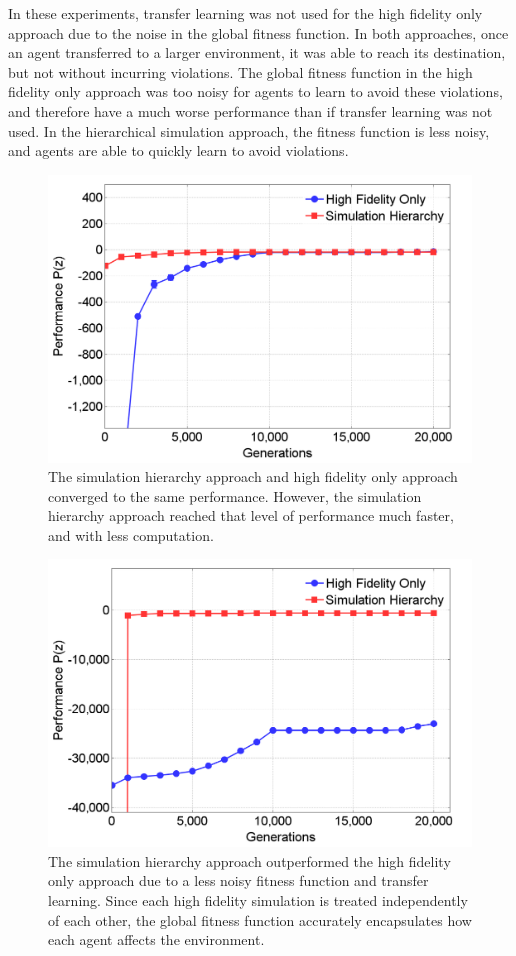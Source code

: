 \documentclass{aamas2014}
\begin{document}
In these experiments, transfer learning was not used for the high fidelity only approach due to the noise in the global fitness function. In both approaches, once an agent transferred to a larger environment, it was able to reach its destination, but not without incurring violations. The global fitness function in the high fidelity only approach was too noisy for agents to learn to avoid these violations, and therefore have a much worse performance than if transfer learning was not used. In the hierarchical simulation approach, the fitness function is less noisy, and agents are able to quickly learn to avoid violations.

\begin{figure}
\centering
\includegraphics[width=.75\columnwidth]{SmallPerformance}
\caption{The simulation hierarchy approach and high fidelity only approach converged to the same performance. However, the simulation hierarchy approach reached that level of performance much faster, and with less computation.}
\label{fig:12Performance}
\end{figure}

\begin{figure}
\centering
\includegraphics[width=.75\columnwidth]{LargePerformance}
\caption{The simulation hierarchy approach outperformed the high fidelity only approach due to a less noisy fitness function and transfer learning. Since each high fidelity simulation is treated independently of each other, the global fitness function accurately encapsulates how each agent affects the environment.}
\label{fig:60Performance}
\end{figure}
\end{document}
